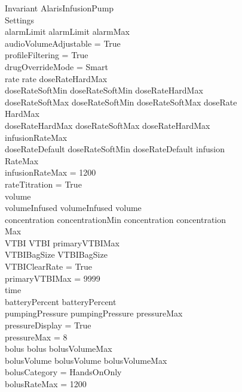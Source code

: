 \begin{schema}{Invariant}
	AlarisInfusionPump\\
	Settings\\
	\where
	alarmLimit  \land alarmLimit \leq alarmMax\\
	audioVolumeAdjustable = True\\
	profileFiltering = True\\
	drugOverrideMode = Smart\\
	rate  \land rate \leq doseRateHardMax\\
	doseRateSoftMin  \land doseRateSoftMin \leq doseRateHardMax\\
	doseRateSoftMax \geq doseRateSoftMin \land doseRateSoftMax \leq doseRate\\
	HardMax\\
	doseRateHardMax \geq doseRateSoftMax \land doseRateHardMax \leq \\
	infusionRateMax\\
	doseRateDefault \geq doseRateSoftMin \land doseRateDefault \leq infusion\\
	RateMax\\
	infusionRateMax = 1200\\
	rateTitration = True\\
	volume \\
	volumeInfused  \land volumeInfused \leq volume\\
	concentration \geq concentrationMin \land concentration \leq concentration\\
	Max\\
	VTBI  \land VTBI \leq primaryVTBIMax\\
	VTBIBagSize  \land VTBIBagSize \\
	VTBIClearRate = True\\
	primaryVTBIMax = 9999\\
	time \\
	\pagebreak
	batteryPercent  \land batteryPercent \\
	pumpingPressure  \land pumpingPressure \leq pressureMax\\
	pressureDisplay = True\\
	pressureMax = 8\\
	bolus  \land bolus \leq bolusVolumeMax\\
	bolusVolume  \land bolusVolume \leq bolusVolumeMax\\
	bolusCategory = HandsOnOnly\\
	bolusRateMax = 1200\\

\end{schema}
